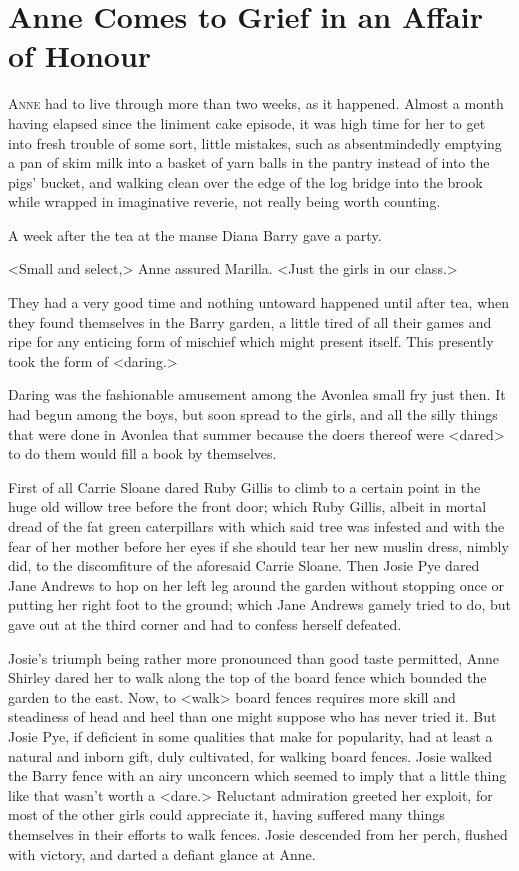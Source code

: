 \chapter{Anne Comes to Grief in an Affair of Honour}

\lettrine[]{A}{nne} had to live through more than two weeks, as it happened. Almost a month having elapsed since the liniment cake episode, it was high time for her to get into fresh trouble of some sort, little mistakes, such as absentmindedly emptying a pan of skim milk into a basket of yarn balls in the pantry instead of into the pigs' bucket, and walking clean over the edge of the log bridge into the brook while wrapped in imaginative reverie, not really being worth counting.

A week after the tea at the manse Diana Barry gave a party.

<Small and select,> Anne assured Marilla. <Just the girls in our class.>

They had a very good time and nothing untoward happened until after tea, when they found themselves in the Barry garden, a little tired of all their games and ripe for any enticing form of mischief which might present itself. This presently took the form of <daring.>

Daring was the fashionable amusement among the Avonlea small fry just then. It had begun among the boys, but soon spread to the girls, and all the silly things that were done in Avonlea that summer because the doers thereof were <dared> to do them would fill a book by themselves.

First of all Carrie Sloane dared Ruby Gillis to climb to a certain point in the huge old willow tree before the front door; which Ruby Gillis, albeit in mortal dread of the fat green caterpillars with which said tree was infested and with the fear of her mother before her eyes if she should tear her new muslin dress, nimbly did, to the discomfiture of the aforesaid Carrie Sloane. Then Josie Pye dared Jane Andrews to hop on her left leg around the garden without stopping once or putting her right foot to the ground; which Jane Andrews gamely tried to do, but gave out at the third corner and had to confess herself defeated.

Josie's triumph being rather more pronounced than good taste permitted, Anne Shirley dared her to walk along the top of the board fence which bounded the garden to the east. Now, to <walk> board fences requires more skill and steadiness of head and heel than one might suppose who has never tried it. But Josie Pye, if deficient in some qualities that make for popularity, had at least a natural and inborn gift, duly cultivated, for walking board fences. Josie walked the Barry fence with an airy unconcern which seemed to imply that a little thing like that wasn't worth a <dare.> Reluctant admiration greeted her exploit, for most of the other girls could appreciate it, having suffered many things themselves in their efforts to walk fences. Josie descended from her perch, flushed with victory, and darted a defiant glance at Anne.

